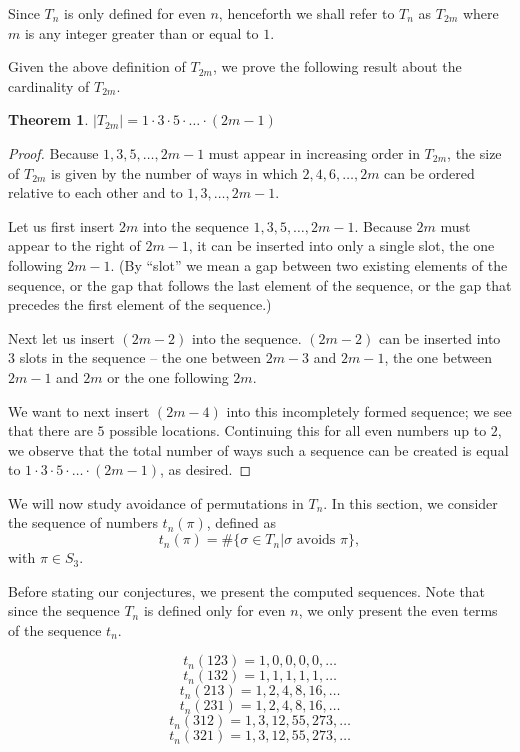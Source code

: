 \documentclass[11pt,letterpaper,twoside,english]{article}
\theoremstyle{theorem}
\newtheorem{theorem}{Theorem}[section]
\theoremstyle{remark}
\begin{document}
Since $T_n$ is only defined for even $n$, henceforth we shall refer to $T_n$ as $T_{2m}$ where $m$ is any integer greater than or equal to $1$.

Given the above definition of $T_{2m}$, we prove the following result about the cardinality of $T_{2m}$.

\begin{theorem}
$|T_{2m}| = 1 \cdot 3 \cdot 5 \cdot \ldots \cdot (2m-1)$
\end{theorem}

\begin{proof}
Because $1,3,5,\ldots,2m-1$ must appear in increasing order in $T_{2m}$, the size of $T_{2m}$ is given by the number of ways in which $2, 4, 6, \ldots, 2m$ can be ordered relative to each other and to $1, 3, \ldots, 2m-1$.

Let us first insert $2m$ into the sequence $1,3,5,\ldots,2m-1$. Because $2m$ must appear to the right of $2m-1$, it can be inserted into only a single slot, the one following $2m-1$. (By ``slot'' we mean a gap between two existing elements of the sequence, or the gap that follows the last element of the sequence, or the gap that precedes the first element of the sequence.)

Next let us insert $(2m-2)$ into the sequence. $(2m-2)$ can be inserted into $3$ slots in the sequence -- the one between $2m-3$ and $2m-1$, the one between $2m-1$ and $2m$ or the one following $2m$.

We want to next insert $(2m-4)$ into this incompletely formed sequence; we see that there are $5$ possible locations. Continuing this for all even numbers up to $2$, we observe that the total number of ways such a sequence can  be created is equal to $1 \cdot 3 \cdot 5 \cdot \ldots \cdot (2m-1)$, as desired.
\end{proof}

We will now study avoidance of permutations in $T_n$. In this section, we consider the sequence of numbers $t_n(\pi)$, defined as 
\[t_n(\pi)=\#\{\sigma\in T_n|\sigma \text{ avoids } \pi\},\]
with $\pi\in S_3$.

Before stating our conjectures, we present the computed sequences. Note that since the sequence $T_n$ is defined only for even $n$, we only present the even terms of the sequence $t_n$.

$$t_n(123) = 1, 0, 0, 0, 0, \ldots$$
$$t_n(132) = 1, 1, 1, 1, 1, \ldots$$
$$t_n(213) = 1, 2, 4, 8, 16, \ldots$$
$$t_n(231) = 1, 2, 4, 8, 16, \ldots$$
$$t_n(312) = 1, 3, 12, 55, 273, \ldots$$
$$t_n(321) = 1, 3, 12, 55, 273, \ldots$$
\end{document}

